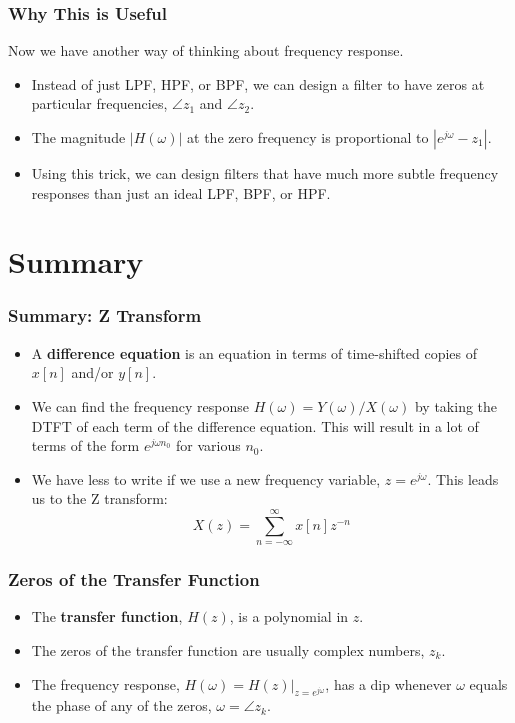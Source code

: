 \documentclass{beamer}
\begin{document}
\begin{frame}
  \frametitle{Why This is Useful}

  Now we have another way of thinking about frequency response.
  \begin{itemize}
    \item Instead of just LPF, HPF, or BPF, we can design a filter to have
      zeros at particular frequencies, $\angle z_1$ and $\angle z_2$.
    \item The magnitude $|H(\omega)|$ at the zero frequency is
      proportional to $|e^{j\omega}-z_1|$.
    \item Using this trick, we can design filters that have much more
      subtle frequency responses than just an ideal LPF, BPF, or HPF.
  \end{itemize}
\end{frame}

\section[Summary]{Summary}
\setcounter{subsection}{1}

\begin{frame}
  \frametitle{Summary: Z Transform}
  \begin{itemize}
  \item A {\bf difference equation} is an equation in terms of
    time-shifted copies of $x[n]$ and/or $y[n]$.
  \item We can find the frequency response
    $H(\omega)=Y(\omega)/X(\omega)$ by taking the DTFT of each term of
    the difference equation.  This will result in a lot of terms of
    the form $e^{j\omega n_0}$ for various $n_0$.
  \item We have less to write if we use a new frequency variable,
    $z=e^{j\omega}$.  This leads us to the Z transform:
    \[
    X(z) = \sum_{n=-\infty}^\infty x[n]z^{-n}
    \]
  \end{itemize}
\end{frame}

\begin{frame}
  \frametitle{Zeros of the Transfer Function}
  \begin{itemize}
  \item The {\bf transfer function}, $H(z)$, is a polynomial in $z$.
  \item The zeros of the transfer function are usually complex numbers, $z_k$.
  \item The frequency response, $H(\omega) = H(z)\vert_{z=e^{j\omega}}$, has a dip
    whenever $\omega$ equals the phase of any of the zeros, $\omega=\angle z_k$.
  \end{itemize}
\end{frame}
    
\end{document}
